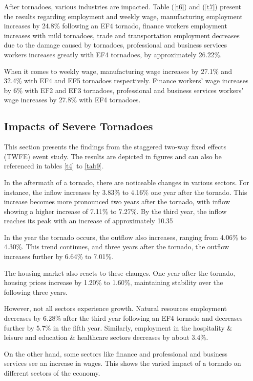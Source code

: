 \documentclass[letterpaper]{article}
\begin{document}
After tornadoes, various industries are impacted. Table (\ref{t6}) and (\ref{t7}) present the results regarding employment and weekly wage, manufacturing employment increases by 24.8\% following an EF4 tornado, finance workers employment increases with mild tornadoes, trade and transportation employment decreases due to the damage caused by tornadoes, professional and business services workers increases greatly with EF4 tornadoes, by approximately 26.22\%.

When it comes to weekly wage, manufacturing wage increases by 27.1\% and 32.4\% with EF4 and EF5 tornadoes respectively. Finance workers' wage increases by 6\% with EF2 and EF3 tornadoes, professional and business services workers' wage increases by 27.8\% with EF4 tornadoes.

\subsection{Impacts of Severe Tornadoes}

This section presents the findings from the staggered two-way fixed effects (TWFE) event study. The results are depicted in figures and can also be referenced in tables \ref{t4} to \ref{tab9}.


In the aftermath of a tornado, there are noticeable changes in various sectors. For instance, the inflow increases by 3.83\% to 4.16\% one year after the tornado. This increase becomes more pronounced two years after the tornado, with inflow showing a higher increase of 7.11\% to 7.27\%. By the third year, the inflow reaches its peak with an increase of approximately 10.35%

In the year the tornado occurs, the outflow also increases, ranging from 4.06\% to 4.30\%. This trend continues, and three years after the tornado, the outflow increases further by 6.64\% to 7.01\%.

The housing market also reacts to these changes. One year after the tornado, housing prices increase by 1.20\% to 1.60\%, maintaining stability over the following three years.

However, not all sectors experience growth. Natural resources employment decreases by 6.28\% after the third year following an EF4 tornado and decreases further by 5.7\% in the fifth year. Similarly, employment in the hospitality \& leisure and education \& healthcare sectors decreases by about 3.4\%.

On the other hand, some sectors like finance and professional and business services see an increase in wages. This shows the varied impact of a tornado on different sectors of the economy.
\end{document}
